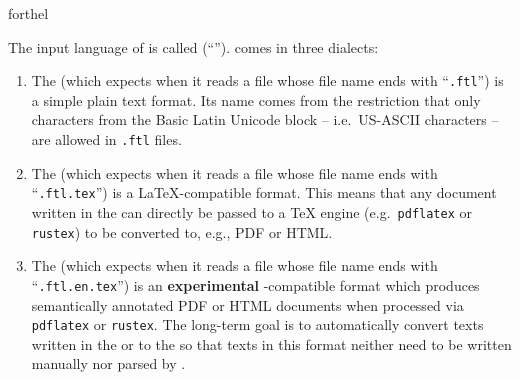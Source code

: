 \documentclass{stex}
\begin{document}
\begin{smodule}{forthel}

\ifinputref\else{}\fi

\begin{sfragment}[id=sec:forthel]{\ForTheL}
  \begin{sparagraph}[style=symdoc,for={forthel,asciidialect,texdialect,stexdialect}]
    The input language of \Naproche is called \forthel
    (``'').
    \forthel comes in three dialects:
    \begin{enumerate}
      \item The \asciidialect (which \Naproche expects when it reads a
        file whose file name ends with ``\texttt{.ftl}'') is a simple plain text format.
        Its name comes from the restriction that only characters from the Basic Latin
        Unicode block -- i.e.\ US-ASCII characters -- are allowed in \texttt{.ftl} files.
      \item The \texdialect (which \Naproche expects when it reads a
        file whose file name ends with ``\texttt{.ftl.tex}'') is a \LaTeX-compatible
        format. This means that any document written in the \texdialect can directly
        be passed to a \TeX{} engine (e.g.\ \texttt{pdflatex} or \texttt{rustex}) to be
        converted to, e.g., PDF or HTML.
      \item The \stexdialect (which \Naproche expects when it reads a
        file whose file name ends with ``\texttt{.ftl.en.tex}'') is an
        \textbf{experimental} \sTeX-compatible format which produces semantically
        annotated PDF or HTML documents when processed via \texttt{pdflatex} or
        \texttt{rustex}.
        The long-term goal is to automatically convert \forthel texts written in the
         or \texdialect to the \stexdialect so that
        texts in this format neither need to be written manually nor parsed by \Naproche.
    \end{enumerate}
  \end{sparagraph}
\end{sfragment}

\ifinputref\else{}\fi

\end{smodule}
\end{document}
